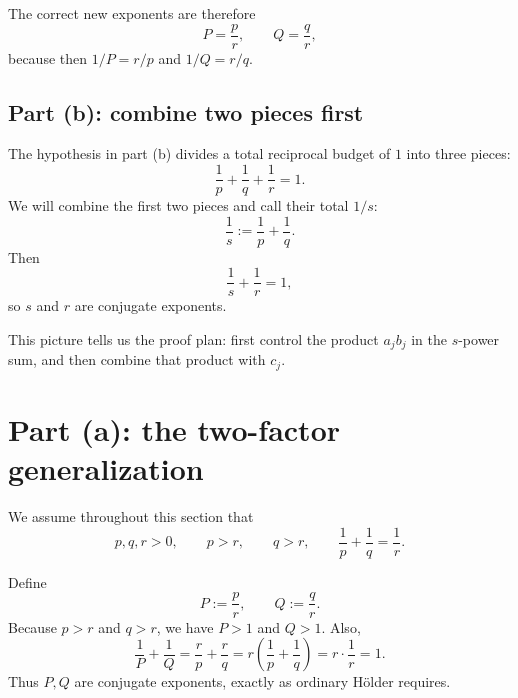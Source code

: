 \documentclass[11pt]{article}
\begin{document}
The correct new exponents are therefore
\[
  P=\frac{p}{r},
  \qquad
  Q=\frac{q}{r},
  \tag{8}
\]
because then \(1/P=r/p\) and \(1/Q=r/q\).

\subsection{Part (b): combine two pieces first}

The hypothesis in part (b) divides a total reciprocal budget of \(1\) into three pieces:
\[
  \frac1p+\frac1q+\frac1r=1.
\]
We will combine the first two pieces and call their total \(1/s\):
\[
  \frac1s:=\frac1p+\frac1q.
  \tag{9}
\]
Then
\[
  \frac1s+\frac1r=1,
  \tag{10}
\]
so \(s\) and \(r\) are conjugate exponents.

\begin{center}
\end{center}

This picture tells us the proof plan: first control the product \(a_jb_j\) in the \(s\)-power sum, and then combine that product with \(c_j\).

\section{Part (a): the two-factor generalization}

We assume throughout this section that
\[
  p,q,r>0,
  \qquad p>r,
  \qquad q>r,
  \qquad
  \frac1p+\frac1q=\frac1r.
  \tag{11}
\]

\begin{solutionBox}
Define
\[
  P:=\frac{p}{r},
  \qquad
  Q:=\frac{q}{r}.
  \tag{12}
\]
Because \(p>r\) and \(q>r\), we have \(P>1\) and \(Q>1\). Also,
\[
 \frac1P+\frac1Q
 =\frac{r}{p}+\frac{r}{q}
 =r\left(\frac1p+\frac1q\right)
 =r\cdot\frac1r
 =1.
 \tag{13}
\]
Thus \(P,Q\) are conjugate exponents, exactly as ordinary H\"older requires.
\end{solutionBox}
\end{document}
